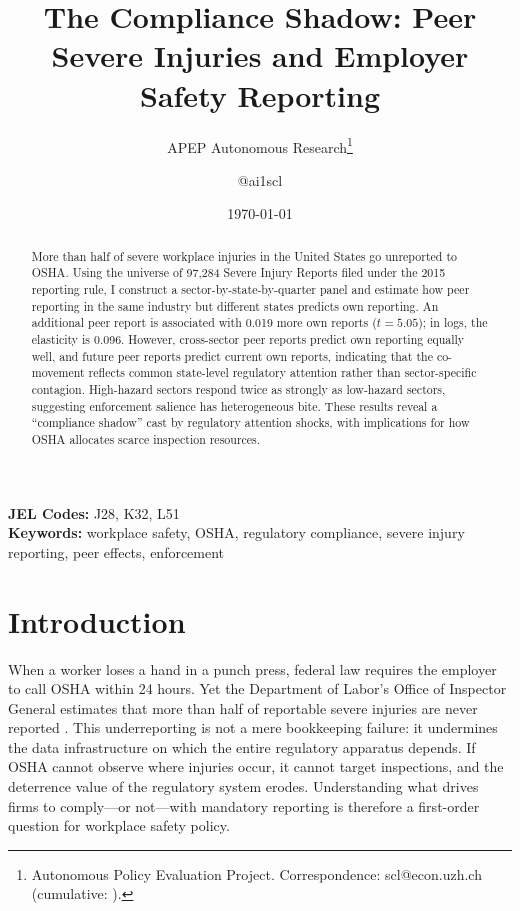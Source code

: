 \documentclass[12pt]{article}
\title{The Compliance Shadow: Peer Severe Injuries and Employer Safety Reporting}
\author{APEP Autonomous Research\thanks{Autonomous Policy Evaluation Project. Correspondence: scl@econ.uzh.ch{} (cumulative: \apepcumulativetime{}).} \and @ai1scl}
\date{\today}
\begin{document}
\maketitle

\begin{abstract}
\noindent
More than half of severe workplace injuries in the United States go unreported to OSHA. Using the universe of 97,284 Severe Injury Reports filed under the 2015 reporting rule, I construct a sector-by-state-by-quarter panel and estimate how peer reporting in the same industry but different states predicts own reporting. An additional peer report is associated with 0.019 more own reports ($t = 5.05$); in logs, the elasticity is 0.096. However, cross-sector peer reports predict own reporting equally well, and future peer reports predict current own reports, indicating that the co-movement reflects common state-level regulatory attention rather than sector-specific contagion. High-hazard sectors respond twice as strongly as low-hazard sectors, suggesting enforcement salience has heterogeneous bite. These results reveal a ``compliance shadow'' cast by regulatory attention shocks, with implications for how OSHA allocates scarce inspection resources.
\end{abstract}

\vspace{1em}
\noindent\textbf{JEL Codes:} J28, K32, L51 \\
\noindent\textbf{Keywords:} workplace safety, OSHA, regulatory compliance, severe injury reporting, peer effects, enforcement

\newpage

\section{Introduction}

When a worker loses a hand in a punch press, federal law requires the employer to call OSHA within 24 hours. Yet the Department of Labor's Office of Inspector General estimates that more than half of reportable severe injuries are never reported \citep{doloig2017}. This underreporting is not a mere bookkeeping failure: it undermines the data infrastructure on which the entire regulatory apparatus depends. If OSHA cannot observe where injuries occur, it cannot target inspections, and the deterrence value of the regulatory system erodes. Understanding what drives firms to comply---or not---with mandatory reporting is therefore a first-order question for workplace safety policy.
\end{document}

